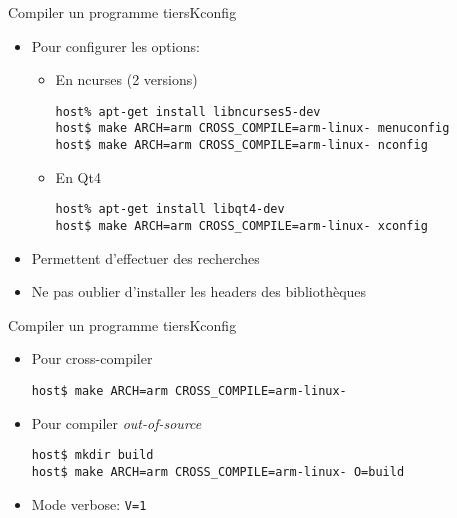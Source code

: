 \begin{frame}[fragile=singleslide]{Compiler un programme tiers}{Kconfig}
  \begin{itemize}
  \item Pour configurer les options:
    \begin{itemize}
    \item En ncurses (2 versions)
\begin{lstlisting}
host% apt-get install libncurses5-dev
host$ make ARCH=arm CROSS_COMPILE=arm-linux- menuconfig
host$ make ARCH=arm CROSS_COMPILE=arm-linux- nconfig
\end{lstlisting} %
    \item En Qt4
\begin{lstlisting}
host% apt-get install libqt4-dev
host$ make ARCH=arm CROSS_COMPILE=arm-linux- xconfig
\end{lstlisting} %
    \end{itemize}
  \item Permettent d'effectuer des recherches
  \item Ne pas oublier d'installer les headers des bibliothèques
  \end{itemize}
\end{frame}

\begin{frame}[fragile=singleslide]{Compiler un programme tiers}{Kconfig}
  \begin{itemize}
  \item Pour cross-compiler
\begin{lstlisting}
host$ make ARCH=arm CROSS_COMPILE=arm-linux-
\end{lstlisting} %
  \item Pour compiler \emph{out-of-source}
\begin{lstlisting}
host$ mkdir build
host$ make ARCH=arm CROSS_COMPILE=arm-linux- O=build
\end{lstlisting} %
  \item Mode verbose: \verb+V=1+
  \end{itemize}
\end{frame}

